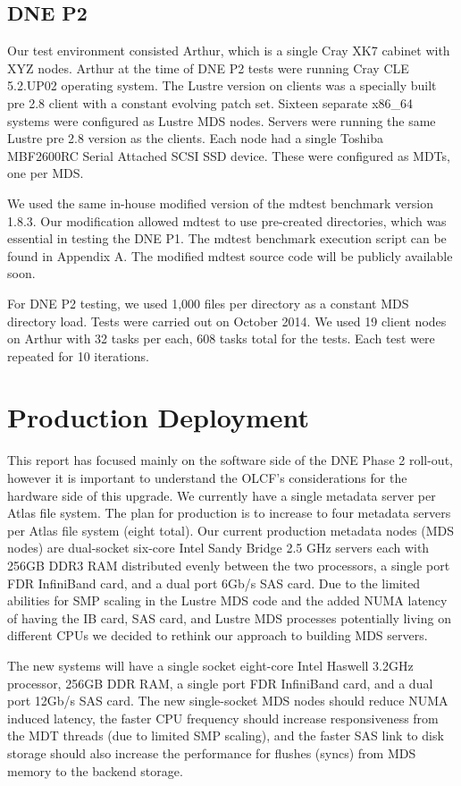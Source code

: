 \documentclass[conference,compsoc]{IEEEtran}
\begin{document}
\subsection{DNE P2}

Our test environment consisted Arthur, which is a single Cray XK7 cabinet with
XYZ nodes. Arthur at the time of DNE P2 tests were running Cray CLE 5.2.UP02
operating system. The Lustre version on clients was a specially built pre 2.8
client with a constant evolving patch set. Sixteen separate x86\_64 systems were
configured as Lustre MDS nodes. Servers were running the same Lustre pre 2.8
version as the clients. Each node had a single Toshiba MBF2600RC Serial
Attached SCSI SSD device. These were configured as MDTs, one per MDS. 

We used the same in-house modified version of the mdtest benchmark version
1.8.3. Our modification allowed mdtest to use pre-created directories, which was
essential in testing the DNE P1. The mdtest benchmark execution script can be
found in Appendix A. The modified mdtest source code will be publicly available
soon.

For DNE P2 testing, we used 1,000 files per directory as a constant MDS
directory load. Tests were carried out on October 2014. We used 19 client nodes
on Arthur with 32 tasks per each, 608 tasks total for the tests. Each test were
repeated for 10 iterations.


\section{Production Deployment}

This report has focused mainly on the software side of the DNE Phase 2 roll-out,
however it is important to understand the OLCF's considerations for the
hardware side of this upgrade. We currently have a single metadata server per
Atlas file system. The plan for production is to increase to four metadata
servers per Atlas file system (eight total). Our current production metadata
nodes (MDS nodes) are dual-socket six-core Intel Sandy Bridge 2.5 GHz servers
each with 256GB DDR3 RAM distributed evenly between the two processors, a
single port FDR InfiniBand card, and a dual port 6Gb/s SAS card. Due to the
limited abilities for SMP scaling in the Lustre MDS code and the added NUMA
latency of having the IB card, SAS card, and Lustre MDS processes potentially
living on different CPUs we decided to rethink our approach to building MDS
servers.

The new systems will have a single socket eight-core Intel Haswell 3.2GHz
processor, 256GB DDR RAM, a single port FDR InfiniBand card, and a dual port
12Gb/s SAS card. The new single-socket MDS nodes should reduce NUMA induced
latency, the faster CPU frequency should increase responsiveness from the MDT
threads (due to limited SMP scaling), and the faster SAS link to disk storage
should also increase the performance for flushes (syncs) from MDS memory to the
backend storage.
\end{document}
